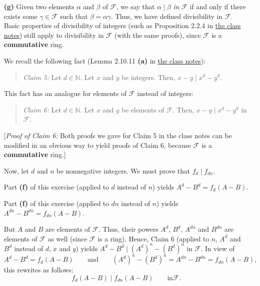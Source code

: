 \documentclass[paper=a4, fontsize=12pt]{scrartcl}%
\theoremstyle{plainsl}
\theoremstyle{definition}
\theoremstyle{remark}
\newenvironment{statement}{\begin{quote}}{\end{quote}}
\begin{document}
\bigskip

\textbf{(g)} Given two elements $\alpha$ and $\beta$ of $\mathcal{F}$, we say
that $\alpha\mid\beta$ \textit{in }$\mathcal{F}$ if and only if there exists
some $\gamma\in\mathcal{F}$ such that $\beta=\alpha\gamma$. Thus, we have
defined divisibility in $\mathcal{F}$. Basic properties of divisibility of
integers (such as Proposition 2.2.4 in
\href{http://www.cip.ifi.lmu.de/~grinberg/t/19s/notes.pdf}{the class notes})
still apply to divisibility in $\mathcal{F}$ (with the same proofs), since
$\mathcal{F}$ is a \textbf{commutative} ring.

We recall the following fact (Lemma 2.10.11 \textbf{(a)} in
\href{http://www.cip.ifi.lmu.de/~grinberg/t/19s/notes.pdf}{the class notes}):

\begin{statement}
\textit{Claim 5:} Let $d\in\mathbb{N}$. Let $x$ and $y$ be integers. Then,
$x-y\mid x^{d}-y^{d}$.
\end{statement}

This fact has an analogue for elements of $\mathcal{F}$ instead of integers:

\begin{statement}
\textit{Claim 6:} Let $d\in\mathbb{N}$. Let $x$ and $y$ be elements of
$\mathcal{F}$. Then, $x-y\mid x^{d}-y^{d}$ in $\mathcal{F}$.
\end{statement}

[\textit{Proof of Claim 6:} Both proofs we gave for Claim 5 in the class notes
can be modified in an obvious way to yield proofs of Claim 6, because
$\mathcal{F}$ is a \textbf{commutative} ring.]

Now, let $d$ and $n$ be nonnegative integers. We must prove that $f_{d}\mid
f_{dn}$.

Part \textbf{(f)} of this exercise (applied to $d$ instead of $n$) yields
$A^{d}-B^{d}=f_{d}\left(  A-B\right)  $.

Part \textbf{(f)} of this exercise (applied to $dn$ instead of $n$) yields
$A^{dn}-B^{dn}=f_{dn}\left(  A-B\right)  $.

But $A$ and $B$ are elements of $\mathcal{F}$. Thus, their powers $A^{d}$,
$B^{d}$, $A^{dn}$ and $B^{dn}$ are elements of $\mathcal{F}$ as well (since
$\mathcal{F}$ is a ring). Hence, Claim 6 (applied to $n$, $A^{d}$ and $B^{d}$
instead of $d$, $x$ and $y$) yields $A^{d}-B^{d}\mid\left(  A^{d}\right)
^{n}-\left(  B^{d}\right)  ^{n}$ in $\mathcal{F}$. In view of
\[
A^{d}-B^{d}=f_{d}\left(  A-B\right)  \qquad\text{and}\qquad\left(
A^{d}\right)  ^{n}-\left(  B^{d}\right)  ^{n}=A^{dn}-B^{dn}=f_{dn}\left(
A-B\right)  ,
\]
this rewrites as follows:%
\[
f_{d}\left(  A-B\right)  \mid f_{dn}\left(  A-B\right)  \qquad\text{in
}\mathcal{F}.
\]
\end{document}
